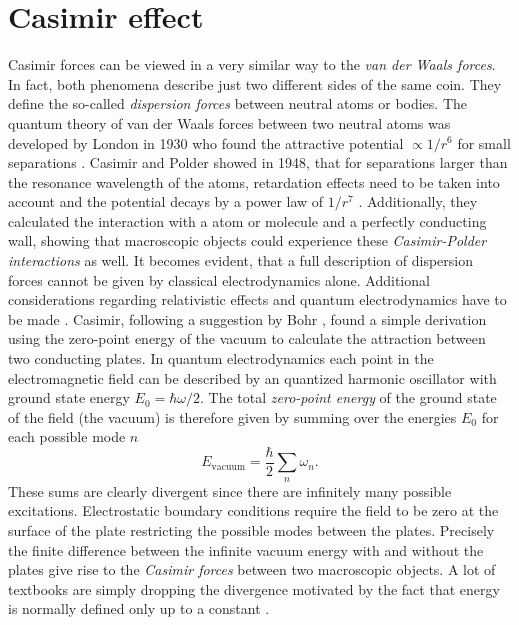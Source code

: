 \chapter{Casimir effect}\label{cha:casimir-effect}

Casimir forces can be viewed in a very similar way to the \textit{van der Waals forces}. In fact, both phenomena describe just two different sides of the same coin. They define the so-called \emph{dispersion forces} between neutral atoms or bodies.
The quantum theory of van der Waals forces between two neutral atoms was developed by London in 1930 who found the attractive potential $\propto 1/r^6$ for small separations \cite{London_1930}.
Casimir and Polder showed in 1948, that for separations larger than the resonance wavelength of the atoms, retardation effects need to be taken into account and the potential decays by a power law of $1/r^7$ \cite{Casimir_1948a}. 
Additionally, they calculated the interaction with a atom or molecule and a perfectly conducting wall, showing that macroscopic objects could experience these \emph{Casimir-Polder interactions} as well.
It becomes evident, that a full description of dispersion forces cannot be given by classical electrodynamics alone. Additional considerations regarding relativistic effects and quantum electrodynamics have to be made \cite{Bordag_2001,Klimchitskaya_2009,Lamoreaux_2004}.
Casimir, following a suggestion by Bohr \cite{Bordag_1999}, found a simple derivation using the zero-point energy of the vacuum to calculate the attraction between two conducting plates.
In quantum electrodynamics each point in the electromagnetic field can be described by an quantized harmonic oscillator with ground state energy $E_0 = \hbar\omega/2$.
The total \textit{zero-point energy} of the ground state of the field (the vacuum) is therefore given by summing over the energies $E_0$ for each possible mode $n$
\begin{equation}
  E_\mathrm{vacuum} = \frac{\hbar}{2} \sum_n \omega_n.
\end{equation} 
These sums are clearly divergent since there are infinitely many possible excitations.
Electrostatic boundary conditions require the field to be zero at the surface of the plate restricting the possible modes between the plates.
Precisely the finite difference between the infinite vacuum energy with and without the plates give rise to the \emph{Casimir forces} between two macroscopic objects.
A lot of textbooks are simply dropping the divergence motivated by the fact that energy is normally defined only up to a constant \cite{Bordag_2001}. 
